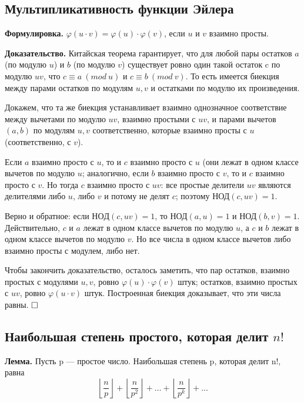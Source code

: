 \documentclass[a4paper, 10pt]{article}
\begin{document}
\subsection{Мультипликативность функции Эйлера}

\textbf{Формулировка.} $\varphi(u \cdot v) = \varphi(u) \cdot \varphi(v)$, если $u$ и $v$ взаимно просты.

\textbf{Доказательство.} Китайская теорема гарантирует, что для любой пары остатков $a$ (по модулю $u$) и $b$ (по модулю $v$) существует ровно один такой остаток c по модулю $uv$, что $c \equiv a \ (mod \ u)$ и $c \equiv b \ (mod \ v)$. То есть имеется биекция между парами остатков по модулям $u, v$ и остатками по модулю их произведения.

Докажем, что та же биекция устанавливает взаимно однозначное соответствие между вычетами по модулю $uv$, взаимно простыми с $uv$, и парами вычетов $(a, b)$ по модулям $u, v$ соответственно, которые взаимно просты с $u$ (соответственно, с $v$).

Если $a$ взаимно просто с $u$, то и $c$ взаимно просто с $u$ (они лежат в одном классе вычетов по модулю $u$; аналогично, если $b$ взаимно просто с $v$, то и $c$ взаимно просто с $v$. Но тогда $c$ взаимно просто с $uv$: все простые делители $uv$ являются делителями либо $u$, либо $v$ и потому не делят $c$; поэтому НОД$(c, uv) = 1$.

Верно и обратное: если $НОД(c,uv) = 1$, то НОД$(a,u) = 1$ и НОД$(b,v) = 1$. Действительно, $c$ и $a$ лежат в одном классе вычетов по модулю $u$, а $c$ и $b$ лежат в одном классе вычетов по модулю $v$. Но все числа в одном классе вычетов либо взаимно просты с модулем, либо нет.

Чтобы закончить доказательство, осталось заметить, что пар остатков, взаимно простых с модулями $u, v$, ровно $\varphi(u) \cdot \varphi(v)$ штук; остатков, взаимно простых с $uv$, ровно $\varphi(u \cdot v)$ штук. Построенная биекция доказывает, что эти числа равны. $\hfill \square$


\subsection{Наибольшая степень простого, которая делит $n!$}\label{332}

\textbf{Лемма.} Пусть p — простое число. Наибольшая степень p, которая делит n!, равна $$\left \lfloor \frac{n}{p} \right \rfloor  + \left \lfloor \frac{n}{p^2} \right \rfloor + \dots + \left \lfloor \frac{n}{p^k} \right \rfloor + \dots$$
\end{document}
